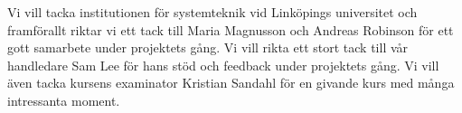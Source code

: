 Vi vill tacka institutionen för systemteknik vid Linköpings universitet och framförallt riktar vi ett tack till Maria Magnusson och Andreas Robinson för ett gott samarbete under projektets gång. Vi vill rikta ett stort tack till vår handledare Sam Lee för hans stöd och feedback under projektets gång. Vi vill även tacka kursens examinator Kristian Sandahl för en givande kurs med många intressanta moment.


